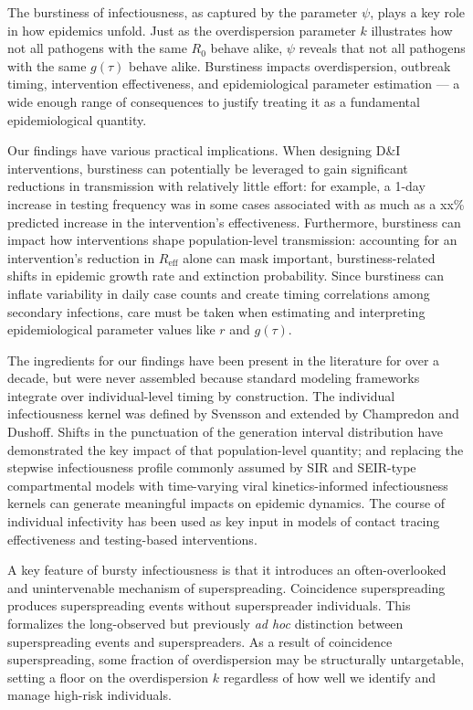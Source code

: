 The burstiness of infectiousness, as captured by the parameter $\psi$, plays a key role in how epidemics unfold. Just as the overdispersion parameter $k$ illustrates how not all pathogens with the same $R_0$ behave alike, $\psi$ reveals that not all pathogens with the same $g(\tau)$ behave alike. Burstiness impacts overdispersion, outbreak timing, intervention effectiveness, and epidemiological parameter estimation --- a wide enough range of consequences to justify treating it as a fundamental epidemiological quantity. 

Our findings have various practical implications. When designing D\&I interventions, burstiness can potentially be leveraged to gain significant reductions in transmission with relatively little effort: for example, a 1-day increase in testing frequency was in some cases associated with as much as a xx\% predicted increase in the intervention's effectiveness. Furthermore, burstiness can impact how interventions shape population-level transmission: accounting for an intervention's reduction in $R_\text{eff}$ alone can mask important, burstiness-related shifts in epidemic growth rate and extinction probability. Since burstiness can inflate variability in daily case counts and create timing correlations among secondary infections, care must be taken when estimating and interpreting epidemiological parameter values like $r$ and $g(\tau)$. 

The ingredients for our findings have been present in the literature for over a decade, but were never assembled because standard modeling frameworks integrate over individual-level timing by construction. The individual infectiousness kernel was defined by Svensson and extended by Champredon and Dushoff. Shifts in the punctuation of the generation interval distribution have demonstrated the key impact of that population-level quantity; and replacing the stepwise infectiousness profile commonly assumed by SIR and SEIR-type compartmental models with time-varying viral kinetics-informed infectiousness kernels can generate meaningful impacts on epidemic dynamics. The course of individual infectivity has been used as key input in models of contact tracing effectiveness and testing-based interventions. 

A key feature of bursty infectiousness is that it introduces an often-overlooked and unintervenable mechanism of superspreading. Coincidence superspreading produces superspreading events without superspreader individuals. This formalizes the long-observed but previously {\it ad hoc} distinction between superspreading events and superspreaders. As a result of coincidence superspreading, some fraction of overdispersion may be structurally untargetable, setting a floor on the overdispersion $k$ regardless of how well we identify and manage high-risk individuals. 

